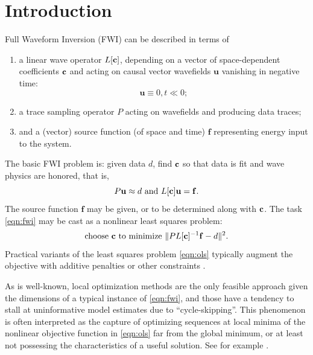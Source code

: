 \documentclass[12pt]{geophysics}
\newcommand{\bff}{\mathbf{f}}
\newcommand{\bu}{\mathbf{u}}
\begin{document}
\section{Introduction}
Full Waveform Inversion (FWI) can be described in terms of 
\begin{enumerate}
\item a linear wave operator $L[{\bf c}]$, depending on a vector of
  space-dependent coefficients ${\bf c}$ and acting on causal vector wavefields $\bu$ vanishing in negative time:
\begin{equation}
\label{eqn:init}
\bu \equiv 0, t \ll 0; 
\end{equation}
\item a trace sampling operator $P$ acting on wavefields and producing data traces;
\item and a (vector) source function (of space and time) $\bff$ representing energy input to the system. 
\end{enumerate}
The basic FWI problem is: given data $d$, find ${\bf c}$ so that data
is fit and wave physics are honored, that is, 
\begin{equation}
\label{eqn:fwi}
P\bu \approx d \mbox{ and } L[\bf{c}]\bu = \bff.
\end{equation}
The source function $\bff$ may be given, or to be determined along
with $\bf{c}$.
The task \ref{eqn:fwi} may be cast as a nonlinear least squares problem: 
\begin{equation}
\label{eqn:ols}
\mbox{choose } {\bf c} \mbox{ to minimize } \|PL[{\bf c}]^{-1}\bff -d \|^2.
\end{equation}
Practical variants of the least squares problem \ref{eqn:ols}
typically augment the objective with additive penalties or other
constraints \cite[]{VirieuxOperto:09,Fichtner:10,Schuster:17}. 

As is well-known, local optimization methods are the only feasible
approach given the dimensions of a typical instance of \ref{eqn:fwi},
and those have a tendency to stall at uninformative model estimates
due to ``cycle-skipping''. This phenomenon is often interpreted as the
capture of optimizing sequences at local minima of the nonlinear objective
function in \ref{eqn:ols} far from the global minimum, or at least not
possessing the characteristics of a useful solution. See for
example \cite{GauTarVir:86,VirieuxOperto:09,PladysBrossierLiMetivier:GEO21}.
\end{document}
